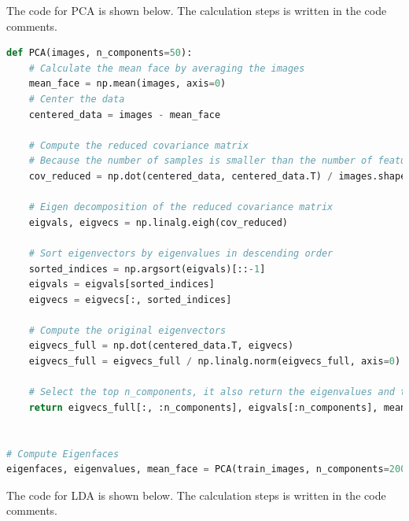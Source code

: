 \documentclass{homework}
\begin{document}
The code for PCA is shown below. The calculation steps is written in the code comments.

\begin{lstlisting}[language=Python]
def PCA(images, n_components=50):
    # Calculate the mean face by averaging the images
    mean_face = np.mean(images, axis=0)
    # Center the data
    centered_data = images - mean_face

    # Compute the reduced covariance matrix
    # Because the number of samples is smaller than the number of features, we can use the reduced formula
    cov_reduced = np.dot(centered_data, centered_data.T) / images.shape[0]

    # Eigen decomposition of the reduced covariance matrix
    eigvals, eigvecs = np.linalg.eigh(cov_reduced)

    # Sort eigenvectors by eigenvalues in descending order
    sorted_indices = np.argsort(eigvals)[::-1]
    eigvals = eigvals[sorted_indices]
    eigvecs = eigvecs[:, sorted_indices]

    # Compute the original eigenvectors
    eigvecs_full = np.dot(centered_data.T, eigvecs)
    eigvecs_full = eigvecs_full / np.linalg.norm(eigvecs_full, axis=0)  # Normalize

    # Select the top n_components, it also return the eigenvalues and the mean face
    return eigvecs_full[:, :n_components], eigvals[:n_components], mean_face


# Compute Eigenfaces
eigenfaces, eigenvalues, mean_face = PCA(train_images, n_components=200)
\end{lstlisting}

The code for LDA is shown below. The calculation steps is written in the code comments.
\end{document}
